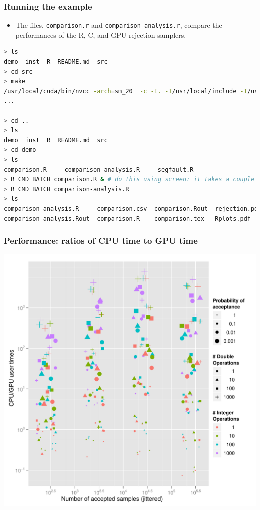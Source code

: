 \documentclass[handout]{beamer}
\numberwithin{equation}{section}
\begin{document}
\begin{frame}[fragile]
\frametitle{Running the example}  \lstset{basicstyle=\tiny}
\begin{itemize}
\item The files, {\tt comparison.r} and {\tt comparison-analysis.r}, compare the performances of the R, C, and GPU rejection samplers.
\end{itemize}

\begin{lstlisting}[language = bash]
> ls
demo  inst  R  README.md  src
> cd src
> make
/usr/local/cuda/bin/nvcc -arch=sm_20  -c -I. -I/usr/local/include -I/usr/local/cuda/include -I/apps/lib64/R/include -I/usr/local/NVIDIA_GPU_Computing_SDK/C/common/inc -Xcompiler -fpic -DRPRINT -DNDEBUG cpu_runif.c -o cpu_runif.o
...

> cd ..
> ls
demo  inst  R  README.md  src
> cd demo
> ls
comparison.R     comparison-analysis.R     segfault.R
> R CMD BATCH comparison.R & # do this using screen: it takes a couple days unless you modify comparison.R
> R CMD BATCH comparison-analysis.R
> ls
comparison-analysis.R     comparison.csv  comparison.Rout  rejection.pdf  segfault.R
comparison-analysis.Rout  comparison.R    comparison.tex   Rplots.pdf     sm.tex
\end{lstlisting}
\end{frame}

\begin{frame}
\frametitle{Performance: ratios of CPU time to GPU time}
\begin{center}
\includegraphics[scale=.42]{../../fig/rejectiontime}
\end{center}
\end{frame}
\end{document}
